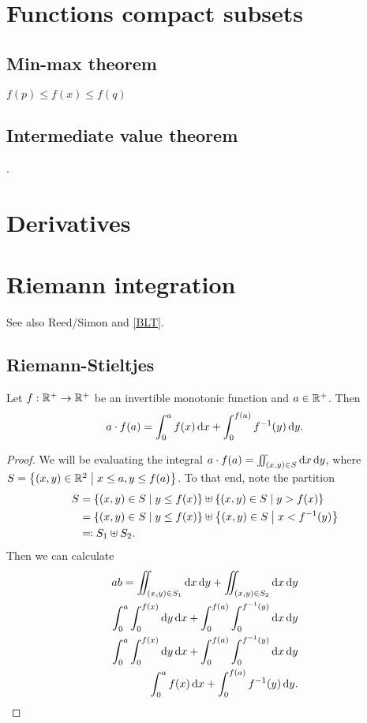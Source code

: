 \section{Functions compact subsets}
\subsection{Min-max theorem} $f(p) \leq f(x) \leq f(q)$

\subsection{Intermediate value theorem}.

\section{Derivatives}

\section{Riemann integration}

See also Reed/Simon and \ref{BLT}.
\subsection{Riemann-Stieltjes}

\begin{lemma} \label{rectanglePartitionedByMonotonicFunction}
Let $f: \mathbb{R}^+ \to \mathbb{R}^+$ be an invertible monotonic function and $a\in\mathbb{R}^+$. Then
\[ a\cdot f(a) = \int_0^a f(x)\operatorname{d \!}{x} + \int_0^{f(a)} f^{-1}(y)\operatorname{d \!}{y}. \]
\end{lemma}
\begin{proof}
We will be evaluating the integral $a\cdot f(a) = \iint_{(x,y)\in S}\operatorname{d \!}{x}\operatorname{d \!}{y}$, where $S = \left\{ (x,y)\in \mathbb{R}^2 \;\middle|\; x\leq a, y\leq f(a) \right\}$. To that end, note the partition
\begin{align*}
S &= \left\{ (x,y)\in S \;\middle|\; y\leq f(x) \right\} \uplus \left\{ (x,y)\in S \;\middle|\; y > f(x) \right\} \\
&= \left\{ (x,y)\in S \;\middle|\; y\leq f(x) \right\} \uplus \left\{ (x,y)\in S \;\middle|\; x < f^{-1}(y) \right\} \\
&\eqqcolon S_1 \uplus S_2.
\end{align*}
Then we can calculate
\begin{align*}
ab = \iint_{(x,y)\in S_1}\diff{x}\diff{y} + \iint_{(x,y)\in S_2}\diff{x}\diff{y} \\
\int_0^a\int_0^{f(x)}\diff{y}\diff{x} + \int_0^{f(a)}\int_0^{f^{-1}(y)}\diff{x}\diff{y} \\
\int_0^a\int_0^{f(x)}\diff{y}\diff{x} + \int_0^{f(a)}\int_0^{f^{-1}(y)}\diff{x}\diff{y} \\
\int_0^a f(x)\diff{x} + \int_0^{f(a)} f^{-1}(y)\diff{y}.
\end{align*}
\end{proof}


